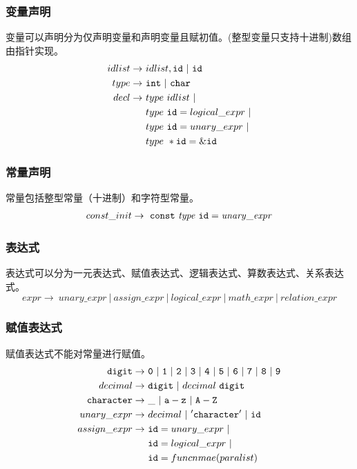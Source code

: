 \documentclass[UTF8,a4paper,10pt]{ctexart}
\begin{document}
\subsubsection{变量声明}
变量可以声明分为仅声明变量和声明变量且赋初值。(整型变量只支持十进制)数组由指针实现。
\begin{align*}
idlist \rightarrow\ & idlist,\tt{id}\ |\ \tt{id}\\
type \rightarrow\ & \tt{int} \ | \ \tt{char}\\
decl \rightarrow\ & type\ idlist \ | \\
&type\ \text{$\tt{id}$} = logical\_expr \ |\\
&type\ \text{$\tt{id}$} = unary\_expr \ | \\
&type \ *\text{$\tt{id}$} = \tt{\&id}
\end{align*}
\subsubsection{常量声明}
常量包括整型常量（十进制）和字符型常量。
\begin{align*}
const\_init\rightarrow\ \tt{const}\ \it{type}\ \tt{id} = \it{unary\_expr}
\end{align*}
\subsubsection{表达式}
表达式可以分为一元表达式、赋值表达式、逻辑表达式、算数表达式、关系表达式。
$$
expr \rightarrow \ unary\_expr \ |\ assign\_expr \ |\ logical\_expr \ |\ math\_expr \ |\ relation\_expr
$$
\subsubsection{赋值表达式}
赋值表达式不能对常量进行赋值。
\begin{align*}
\tt{digit}\rightarrow\  &\tt{0}\ | \ \tt{1}\ | \ \tt{2}\ | \ \tt{3}\ | \ \tt{4}\ | \ \tt{5}\ | \ \tt{6}\ | \ \tt{7}\ | \ \tt{8}\ | \ \tt{9}\\
decimal \rightarrow\  &\tt{digit}\ | \ \text{$decimal$}\ \tt{digit}\\
\tt{character} \rightarrow \ &\tt{\_ \ |\ a-z \ |\ A-Z}\\ 
unary\_expr \rightarrow \ &decimal \ |\ '\tt{character}' \ |\ \tt{id}\\
assign\_expr \rightarrow \ &\text{$\tt{id}$} = unary\_expr \ | \\ 
&\text{$\tt{id}$} = logical\_expr\ | \\
&\text{$\tt{id}$} = funcnmae(paralist)
\end{align*}
\end{document}
